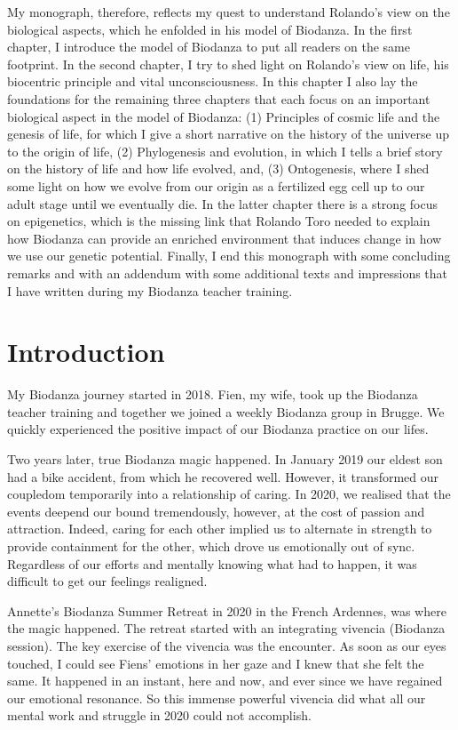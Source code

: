 \documentclass[
  11pt,
]{book}
\begin{document}
My monograph, therefore, reflects my quest to understand Rolando's view on the biological aspects, which he enfolded in his model of Biodanza. In the first chapter, I introduce the model of Biodanza to put all readers on the same footprint. In the second chapter, I try to shed light on Rolando's view on life, his biocentric principle and vital unconsciousness. In this chapter I also lay the foundations for the remaining three chapters that each focus on an important biological aspect in the model of Biodanza: (1) Principles of cosmic life and the genesis of life, for which I give a short narrative on the history of the universe up to the origin of life, (2) Phylogenesis and evolution, in which I tells a brief story on the history of life and how life evolved, and, (3) Ontogenesis, where I shed some light on how we evolve from our origin as a fertilized egg cell up to our adult stage until we eventually die. In the latter chapter there is a strong focus on epigenetics, which is the missing link that Rolando Toro needed to explain how Biodanza can provide an enriched environment that induces change in how we use our genetic potential. Finally, I end this monograph with some concluding remarks and with an addendum with some additional texts and impressions that I have written during my Biodanza teacher training.

\hypertarget{intro}{%
\chapter{Introduction}\label{intro}}

My Biodanza journey started in 2018. Fien, my wife, took up the Biodanza teacher training and together we joined a weekly Biodanza group in Brugge. We quickly experienced the positive impact of our Biodanza practice on our lifes.

Two years later, true Biodanza magic happened.
In January 2019 our eldest son had a bike accident, from which he recovered well.
However, it transformed our coupledom temporarily into a relationship of caring. In 2020, we realised that the events deepend our bound tremendously, however, at the cost of passion and attraction. Indeed, caring for each other implied us to alternate in strength to provide containment for the other, which drove us emotionally out of sync. Regardless of our efforts and mentally knowing what had to happen, it was difficult to get our feelings realigned.

Annette's Biodanza Summer Retreat in 2020 in the French Ardennes, was where the magic happened. The retreat started with an integrating vivencia (Biodanza session). The key exercise of the vivencia was the encounter. As soon as our eyes touched, I could see Fiens' emotions in her gaze and I knew that she felt the same. It happened in an instant, here and now, and ever since we have regained our emotional resonance. So this immense powerful vivencia did what all our mental work and struggle in 2020 could not accomplish.
\end{document}
